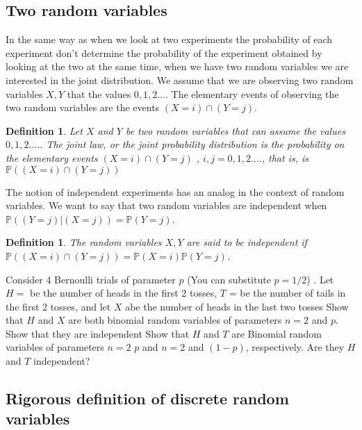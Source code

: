\documentclass[12pt]{article}
\newtheorem{definition}[theorem]{Definition}
\newcommand{\<}{{\langle \!\! \langle}}
\renewcommand{\>}{{\rangle \!\! \rangle}}
\begin{document}
\subsection{Two random variables}
In the same way as when we look at two experiments the probability of each experiment don't determine the probability of the experiment obtained by looking at the two at the same time, when we have two random variables we are interested in the joint distribution. We assume that we are observing two random variables $X,Y$ that the values $0,1,2...$. The elementary events of observing the two random variables are the events $(X= i)\cap (Y = j) $. 
\begin{definition}
	Let $X$ and $Y$ be two random variables that can assume the values $0,1,2.... $. The joint law, or the joint probability distribution is the probability on the elementary events $(X = i) \cap (Y = j)  $  , $i,j = 0,1,2....$, that is, is $\mathbb{P}((X = i)\cap (Y = j) ) $ 

\end{definition}

The notion of independent experiments has an analog in the context of random variables. We want to say that two random variables are independent when $\mathbb{P}( (Y = j) | (X =j) ) = \mathbb{P}( Y = j) $. 

\begin{definition}
	The random variables $X,Y$ are said to be independent if $\mathbb{P}(( X =i)\cap (Y =j) )= \mathbb{P}(X=i)\mathbb{P}(Y=j)$.
\end{definition}

\begin{ExerciseList}
	\Exercise Consider 4 Bernoulli trials of parameter $p$ (You can substitute $p=1/2$) . Let  $H= $ be the number of heads in the first 2 tosses, $T$ = be the number of tails in the first 2 tosses, and let $X$  abe the number of heads in the last two tosses 
	\Question Show that $H$ and $X$ are both binomial random variables of parameters $n=2$ and $p$. Show that they are independent
	\Question Show that $H$ and $T$ are Binomial random variables of parameters $n=2$  $p$ and $n=2$ and $(1-p)$, respectively. Are they $H$ and $T$ independent?

\end{ExerciseList}

\subsection{Rigorous definition of discrete random variables}
\end{document}
